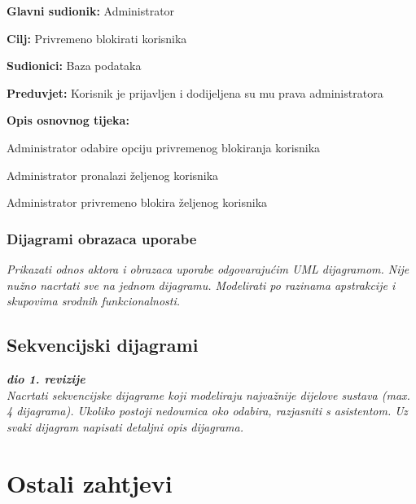 					\noindent {}
					\begin{packed_item}
						
						\item \textbf{Glavni sudionik: }Administrator
						\item  \textbf{Cilj:} Privremeno blokirati korisnika
						\item  \textbf{Sudionici:} Baza podataka
						\item  \textbf{Preduvjet:} Korisnik je prijavljen i dodijeljena su mu prava administratora
						\item  \textbf{Opis osnovnog tijeka:}
						
						\item[] \begin{packed_enum}
							
							\item Administrator odabire opciju privremenog blokiranja korisnika
							\item Administrator pronalazi željenog korisnika
							\item Administrator privremeno blokira željenog korisnika
						\end{packed_enum}
					\end{packed_item}
					
					
					
				\subsubsection{Dijagrami obrazaca uporabe}
					
					\textit{Prikazati odnos aktora i obrazaca uporabe odgovarajućim UML dijagramom. Nije nužno nacrtati sve na jednom dijagramu. Modelirati po razinama apstrakcije i skupovima srodnih funkcionalnosti.}
				\eject		
				
			\subsection{Sekvencijski dijagrami}
				
				\textbf{\textit{dio 1. revizije}}\\
				
				\textit{Nacrtati sekvencijske dijagrame koji modeliraju najvažnije dijelove sustava (max. 4 dijagrama). Ukoliko postoji nedoumica oko odabira, razjasniti s asistentom. Uz svaki dijagram napisati detaljni opis dijagrama.}
				\eject
	
		\section{Ostali zahtjevi}
		
